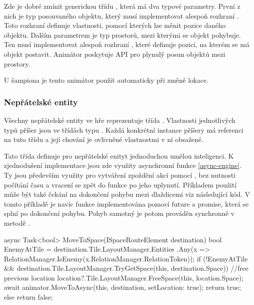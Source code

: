 Zde je dobré zmínit generickou třídu , která má dva typové parametry. První z nich je typ posouvaného 
objektu, který musí implementovat alespoň rozhraní . Toto  rozhraní definuje vlastnosti, pomocí kterých lze měnit
pozice daného objektu. Dalším parametrem je typ prostorů, mezi kterými se objekt pohybuje. Ten musí implementovat alespoň 
rozhraní , které definuje pozici, na kterém se má objekt postavit. Animátor poskytuje API pro plynulý
posun objektů mezi prostory.

U šampiona je tento animátor použit automaticky při změně lokace.

\subsubsection{Nepřátelské entity}

Všechny nepřátelské entity ve hře reprezentuje třída . Vlastnosti jednotlivých typů příšer
jsou ve třídách typu . Každá konkrétní instance 
příšery má referenci na tuto třídu a její chování je ovlivněné vlastnostmi v ní obsažené. 

Tato třída definuje pro nepřátelské enityt jednoduchou umělou inteligenci. K zjednodušení implementace jsou zde využity 
asynchronní funkce \vref{async-engine}. Ty jsou především využity pro vytváření zpoždění akcí pomocí 
, bez nutnosti počítání času a vracení se zpět do funkce po jeho uplynutí. Příkladem 
použití může být také čekání na dokončení pohybu mezi dlaždicemi viz následující kód. V tomto příkladě
je navíc funkce  implementována pomocí future a promise, která se splní 
po dokončení pohybu. Pohyb samotný je potom prováděn synchronně v metodě .

\begin{code}
async Task<bool> MoveToSpace(ISpaceRouteElement destination)
{
 bool EnemyAtTile = destination.Tile.LayoutManager.Entities
  .Any(x => RelationManager.IsEnemy(x.RelationManager.RelationToken));
 if (!EnemyAtTile &&
  destination.Tile.LayoutManager.TryGetSpace(this, destination.Space))
 {
   //free previous location
   location?.Tile.LayoutManager.FreeSpace(this, location.Space);
   await animator.MoveToAsync(this, destination, setLocation: true);
   return true;
 }
 else
   return false;
}
\end{code}

